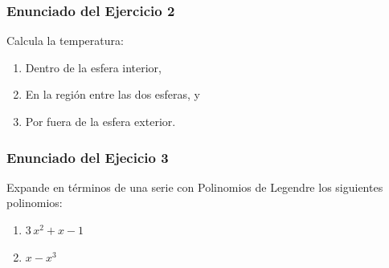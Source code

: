 \documentclass[12pt]{beamer}
\begin{document}
\begin{frame}
\frametitle{Enunciado del Ejercicio 2}
Calcula la temperatura:
\begin{enumerate}
\item Dentro de la esfera interior,
\item En la región entre las dos esferas, y
\item Por fuera de la esfera exterior.
\end{enumerate}
\end{frame}
\begin{frame}
\frametitle{Enunciado del Ejecicio 3}
Expande en términos de una serie con Polinomios de Legendre los siguientes polinomios:
\begin{enumerate}
\item $3 \, x^{2} + x - 1$
\item $x - x^{3}$
\end{enumerate}
\end{frame}
\end{document}
